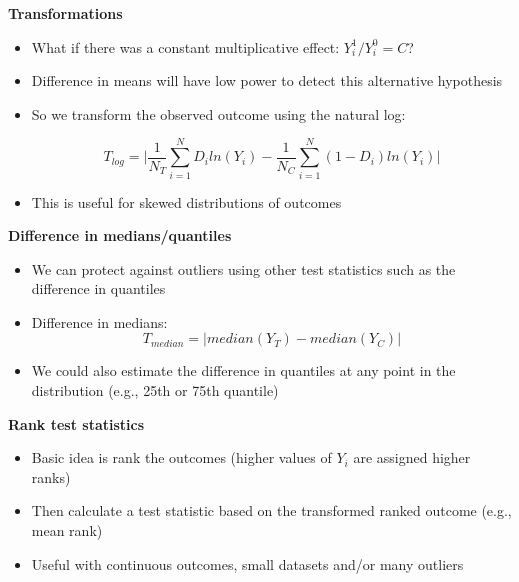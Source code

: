 \documentclass[notes=show]{beamer}
\begin{document}
\begin{frame}[plain]
\begin{center}
\textbf{Transformations}
\end{center}

\begin{itemize}
\item What if there was a constant multiplicative effect: $Y_i^1 / Y_i^0 = C$?
\item Difference in means will have low power to detect this alternative hypothesis
\item So we transform the observed outcome using the natural log:

$$T_{log} = \bigg | \frac{1}{N_T} \sum_{i=1}^N D_i ln(Y_i) - \frac{1}{N_C} \sum_{i=1}^N (1-D_i) ln(Y_i) \bigg |$$
\item This is useful for skewed distributions of outcomes

\end{itemize}

\end{frame}

\begin{frame}[plain]
\begin{center}
\textbf{Difference in medians/quantiles}
\end{center}

\begin{itemize}
\item We can protect against outliers using other test statistics such as the difference in quantiles
\item Difference in medians:$$T_{median} = | median(Y_T) - median(Y_C)|$$
\item We could also estimate the difference in quantiles at any point in the distribution (e.g., 25th or 75th quantile)
\end{itemize}

\end{frame}

\begin{frame}[plain]
\begin{center}
\textbf{Rank test statistics}
\end{center}

\begin{itemize}
\item Basic idea is rank the outcomes (higher values of $Y_i$ are assigned higher ranks) 
\item Then calculate a test statistic based on the transformed ranked outcome (e.g., mean rank)
\item Useful with continuous outcomes, small datasets and/or many outliers
\end{itemize}

\end{frame}
\end{document}
